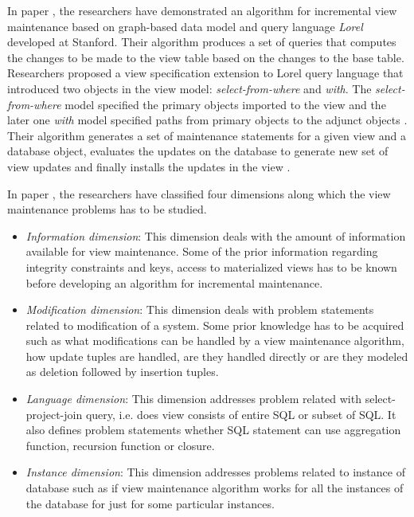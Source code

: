 \documentclass[11pt,a4paper,bibtotoc,idxtotoc,headsepline,footsepline,footexclude,BCOR12mm,DIV13]{scrbook}
\begin{document}
In paper \cite{incrementalmaintenance:materializedviews}, the researchers have demonstrated an algorithm for incremental view maintenance based on graph-based data model and query language \emph{Lorel} developed at Stanford. Their algorithm produces a set of queries that computes the changes to be made to the view table based on the changes to the base table. Researchers proposed a view specification extension to Lorel query language \cite{incrementalmaintenance:materializedviews} that introduced two objects in the view model: \emph{select-from-where} and \emph{with}. The \emph{select-from-where} model specified the primary objects imported to the view and the later one \emph{with} model specified paths from primary objects to the adjunct objects \cite{incrementalmaintenance:materializedviews}. Their algorithm generates a set of maintenance statements for a given view and a database object, evaluates the updates on the database to generate new set of view updates and finally installs the updates in the view \cite{incrementalmaintenance:materializedviews}.

In paper \cite{maintenance:materializedviews}, the researchers have classified four dimensions along which the view maintenance problems has to be studied. 
\begin{itemize}
	\item \emph{Information dimension}: This dimension deals with the amount of information available for view maintenance. Some of the prior information regarding integrity constraints and keys, access to materialized views has to be known before developing an algorithm for incremental maintenance.
	
	\item \emph{Modification dimension}: This dimension deals with problem statements related to modification of a system. Some prior knowledge has to be acquired such as what modifications can be handled by a view maintenance algorithm, how update tuples are handled, are they handled directly or are they modeled as deletion followed by insertion tuples.
	
	\item \emph{Language dimension}: This dimension addresses problem related with select-project-join query, i.e. does view consists of entire SQL or subset of SQL. It also defines problem statements whether SQL statement can use aggregation function, recursion function or closure. 
	
	\item \emph{Instance dimension}: This dimension addresses problems related to instance of database such as if view maintenance algorithm works for all the instances of the database for just for some particular instances. 

\end{itemize}
\end{document}
